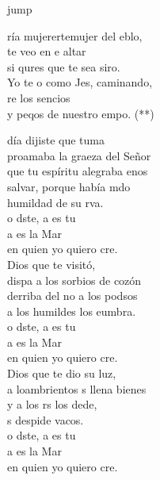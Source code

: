 \begin{cancion}jump\\
	\begin{chorus}%
		ría mujerertemujer del eblo,\\
		 te veo en e altar\\
		si qures que te sea siro.\\
		Yo te o como Jes, caminando, \\
		re los sencios \\
		y peqos de nuestro empo. (**) \jump\\
	\end{chorus}%
	 día dijiste que tuma\\
	proamaba la graeza del Señor\\
	que tu espíritu alegraba enos\\
	 salvar, porque había mdo\\
	humildad de su rva.  \\
	o dste, a es tu \\
	a es la Mar \\
	en quien yo quiero cre.\\
	\jump
	 Dios que te visitó,\\
	dispa a los sorbios de cozón\\
	derriba del no a los podsos\\
	a los humildes los eumbra.\\
	o dste, a es tu \\
	a es la Mar \\
	en quien yo quiero cre.\\
	\jump
	 Dios que te dio su luz,\\
	a loambrientos s llena  bienes\\
	y a los rs los dede,\\
	s despide vacos.\\
	o dste, a es tu \\
	a es la Mar \\
	en quien yo quiero cre.\\
\end{cancion}%

